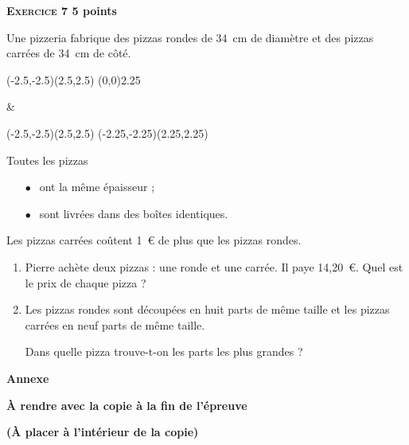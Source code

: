 \textbf{\textsc{Exercice 7} \hfill 5 points}

\medskip

Une pizzeria fabrique des pizzas rondes  de 34~cm  de diamètre et des pizzas carrées de 34~cm de côté.

\begin{center}
\begin{tabularx}{\linewidth}{*{2}{\centering \arraybackslash}X}
\begin{pspicture}(-2.5,-2.5)(2.5,2.5)
\pscircle(0,0){2.25}
\end{pspicture}&
\begin{pspicture}(-2.5,-2.5)(2.5,2.5)
\psframe(-2.25,-2.25)(2.25,2.25)
\end{pspicture}
\end{tabularx}
\end{center}

Toutes les pizzas

\begin{itemize}
\item[$\bullet~~$]ont la même épaisseur ;
\item[$\bullet~~$]sont livrées dans des boîtes identiques.
\end{itemize}
 
\medskip
 
Les  pizzas carrées coûtent 1~\euro{} de plus que les pizzas rondes.
 
 \medskip
 
\begin{enumerate}
\item Pierre achète deux pizzas : une ronde et une carrée. Il paye 14,20~\euro. Quel est le prix de chaque pizza ?
\item Les pizzas rondes sont découpées en huit parts de même taille et les pizzas carrées en neuf parts de même taille.

Dans quelle pizza trouve-t-on les parts les plus grandes ? 
\end{enumerate}

\newpage
\begin{center}
{\large \textbf{Annexe}}

{\large \textbf{À rendre avec la copie à la fin de l'épreuve}}

{\large \textbf{(À placer à l'intérieur de la copie)}}
\end{center}

